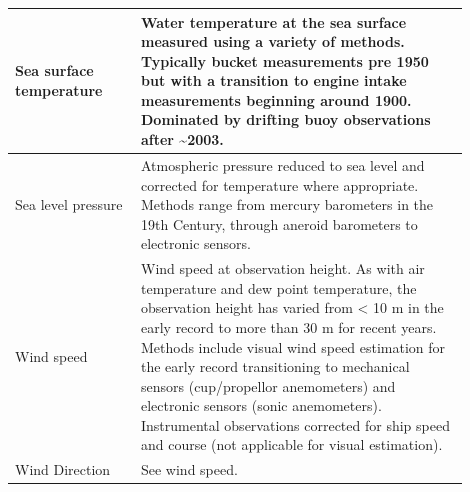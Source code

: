 \begin{table}
\begin{tabular}{|p{0.25\linewidth}|p{0.65\linewidth}|}
Sea surface temperature & Water temperature at the sea surface measured using a variety of methods. Typically bucket measurements pre 1950 but with a transition to engine intake measurements beginning around 1900. Dominated by drifting buoy observations after \sim 2003.\\
\hline
Sea level pressure & Atmospheric pressure reduced to sea level and corrected for temperature where appropriate. Methods range from mercury barometers in the 19th Century, through aneroid barometers to electronic sensors.\\
\hline
Wind speed & Wind speed at observation height. As with air temperature and dew point temperature, the observation height has varied from < 10 m in the early record to more than 30 m for recent years. Methods include visual wind speed estimation for the early record transitioning to mechanical sensors (cup/propellor anemometers) and electronic sensors (sonic anemometers). Instrumental observations corrected for ship speed and course (not applicable for visual estimation).\\
\hline
Wind Direction & See wind speed.\\
\hline
\end{tabular}
\end{table}

